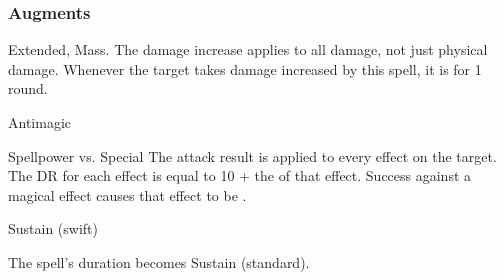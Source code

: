 \subsubsection{Augments}
 Extended, Mass.
The damage increase applies to all damage, not just physical damage.
Whenever the target takes damage increased by this spell, it is  for 1 round.
\begin{spellsection}{Antimagic}
\begin{spellcontent}
\begin{spelltargetinginfo}
\end{spelltargetinginfo}
\begin{spelleffects}
\begin{spellattack}{Spellpower vs. Special}
\spellspecial
The attack result is applied to every  effect on the target.
The DR for each effect is equal to 10 + the  of that effect.
\spellsuccess
Success against a magical effect causes that effect to be .
\end{spellattack}
\spelldur Sustain (swift)
\end{spelleffects}
\end{spellcontent}
\begin{spellfooter}
\miscastexplode
\end{spellfooter}
\begin{spellcantrip}
The spell's duration becomes Sustain (standard).
\end{spellcantrip}
\end{spellsection}

